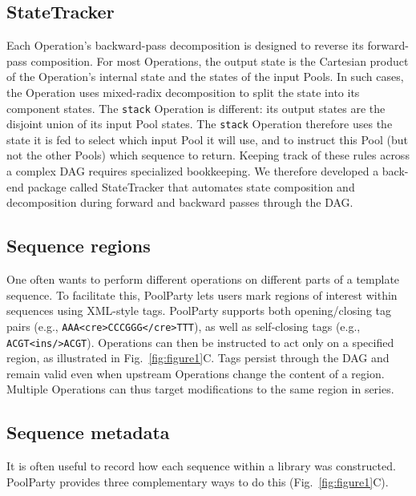 \documentclass[unnumsec,webpdf,modern,large]{mam-authoring-template}%
\theoremstyle{thmstyleone}%
\theoremstyle{thmstyletwo}%
\theoremstyle{thmstylethree}%
\begin{document}
\subsection{StateTracker}

Each Operation's backward-pass decomposition is designed to reverse its forward-pass composition. For most Operations, the output state is the Cartesian product of the Operation's internal state and the states of the input Pools. In such cases, the Operation uses mixed-radix decomposition to split the state into its component states. The \texttt{stack} Operation is different: its output states are the disjoint union of its input Pool states. The \texttt{stack} Operation therefore uses the state it is fed to select which input Pool it will use, and to instruct this Pool (but not the other Pools) which sequence to return. Keeping track of these rules across a complex DAG requires specialized bookkeeping. We therefore developed a back-end package called StateTracker that automates state composition and decomposition during forward and backward passes through the DAG.

\subsection{Sequence regions}

One often wants to perform different operations on different parts of a template sequence. To facilitate this, PoolParty lets users mark regions of interest within sequences using XML-style tags. PoolParty supports both opening/closing tag pairs (e.g., \texttt{AAA<cre>CCCGGG</cre>TTT}), as well as self-closing tags (e.g., \texttt{ACGT<ins/>ACGT}). Operations can then be instructed to act only on a specified region, as illustrated in Fig.\ \ref{fig:figure1}C. Tags persist through the DAG and remain valid even when upstream Operations change the content of a region. Multiple Operations can thus target modifications to the same region in series.

\subsection{Sequence metadata}

It is often useful to record how each sequence within a library was constructed. PoolParty provides three complementary ways to do this (Fig.~\ref{fig:figure1}C).
\end{document}
